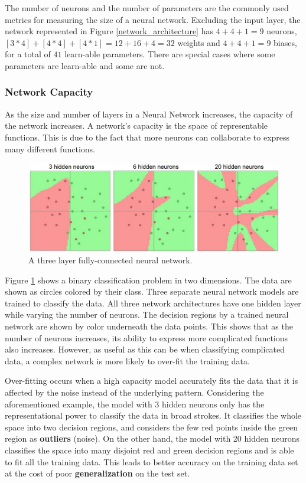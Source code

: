 The number of neurons and the number of parameters are the commonly used metrics for measuring the size of a neural network. Excluding the input layer, the network represented in Figure \ref{network_architecture} has \(4 + 4 + 1 = 9\) neurons, \([3 * 4] + [4 * 4] + [4 * 1] = 12 + 16 + 4 = 32\) weights and \(4 + 4 + 1 = 9\) biases, for a total of \(41\) learn-able parameters. There are special cases where some parameters are learn-able and some are not.
\subsubsection{Network Capacity}
As the size and number of layers in a Neural Network increases, the capacity of the network increases. A network's capacity is the space of representable functions. This is due to the fact that more neurons can collaborate to express many different functions. 
\begin{figure}[ht!]
\includegraphics[trim={0cm 0cm 0cm 0cm},clip,width=\linewidth]{Figures/layer_sizes.jpeg}
\centering
\caption{A three layer fully-connected neural network.}
\label{network_capacity}
\end{figure}

Figure \ref{network_capacity} shows a binary classification problem in two dimensions. The data are shown as circles colored by their class. Three separate neural network models are trained to classify the data. All three network architectures have one hidden layer while varying the number of neurons. The decision regions by a trained neural network are shown by color underneath the data points. This shows that as the number of neurons increases, its ability to express more complicated functions also increases. However, as useful as this can be when classifying complicated data, a complex network is more likely to over-fit the training data.

Over-fitting occurs when a high capacity model accurately fits the data that it is affected by the noise instead of the underlying pattern. Considering the aforementioned example, the model with 3 hidden neurons only has the representational power to classify the data in broad strokes. It classifies the whole space into two decision regions, and considers the few red points inside the green region as \textbf{outliers} (noise). On the other hand, the model with 20 hidden neurons classifies the space into many disjoint red and green decision regions and is able to fit all the training data. This leads to better accuracy on the training data set at the cost of poor \textbf{generalization} on the test set. 
